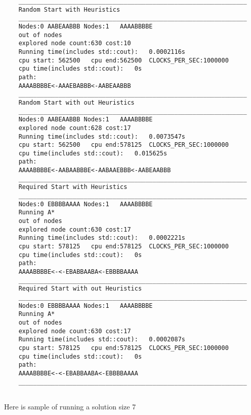 \documentclass[12pt]{article}
\begin{document}
\begin{lstlisting}
	_______________________________________________________________
	Random Start with Heuristics
	_______________________________________________________________
	Nodes:0	AABEAABBB Nodes:1	AAAABBBBE
	out of nodes
	explored node count:630 cost:10
	Running time(includes std::cout):	0.0002116s
	cpu start: 562500	cpu end:562500	CLOCKS_PER_SEC:1000000
	cpu time(includes std::cout):	0s
	path:
	AAAABBBBE<-AAAEBABBB<-AABEAABBB
	_______________________________________________________________
	Random Start with out Heuristics
	_______________________________________________________________
	Nodes:0	AABEAABBB Nodes:1	AAAABBBBE
	explored node count:628 cost:17
	Running time(includes std::cout):	0.0073547s
	cpu start: 562500	cpu end:578125	CLOCKS_PER_SEC:1000000
	cpu time(includes std::cout):	0.015625s
	path:
	AAAABBBBE<-AABAABBBE<-AABAAEBBB<-AABEAABBB
	_______________________________________________________________
	Required Start with Heuristics
	_______________________________________________________________
	Nodes:0	EBBBBAAAA Nodes:1	AAAABBBBE
	Running A*
	out of nodes
	explored node count:630 cost:17
	Running time(includes std::cout):	0.0002221s
	cpu start: 578125	cpu end:578125	CLOCKS_PER_SEC:1000000
	cpu time(includes std::cout):	0s
	path:
	AAAABBBBE<-<-EBABBAABA<-EBBBBAAAA
	_______________________________________________________________
	Required Start with out Heuristics
	_______________________________________________________________
	Nodes:0	EBBBBAAAA Nodes:1	AAAABBBBE
	Running A*
	out of nodes
	explored node count:630 cost:17
	Running time(includes std::cout):	0.0002087s
	cpu start: 578125	cpu end:578125	CLOCKS_PER_SEC:1000000
	cpu time(includes std::cout):	0s
	path:
	AAAABBBBE<-<-EBABBAABA<-EBBBBAAAA
	_______________________________________________________________


\end{lstlisting}
Here is sample of running a solution size 7
\end{document}
